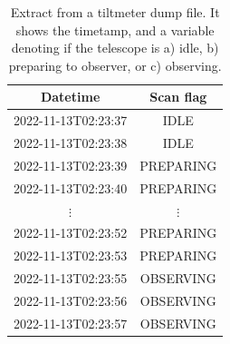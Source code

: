 \begin{table}[H]
    \centering
    \caption[Tiltmeter dump file]{Extract from a tiltmeter dump file. It shows the timetamp, and a variable denoting if the telescope is a) idle, b) preparing to observer, or c) observing.}
    \begin{tabular}{cc}
        \toprule
        Datetime & Scan flag \\
        \midrule
        2022-11-13T02:23:37 & IDLE \\
        2022-11-13T02:23:38 & IDLE \\
        2022-11-13T02:23:39 & PREPARING \\
        2022-11-13T02:23:40 & PREPARING \\
        $\vdots$ & $\vdots$ \\ 
        2022-11-13T02:23:52 & PREPARING \\
        2022-11-13T02:23:53 & PREPARING \\
        2022-11-13T02:23:55 & OBSERVING \\
        2022-11-13T02:23:56 & OBSERVING \\
        2022-11-13T02:23:57 & OBSERVING \\
        \bottomrule
    \end{tabular}
    \label{tab:tiltmeter_example}
\end{table}
